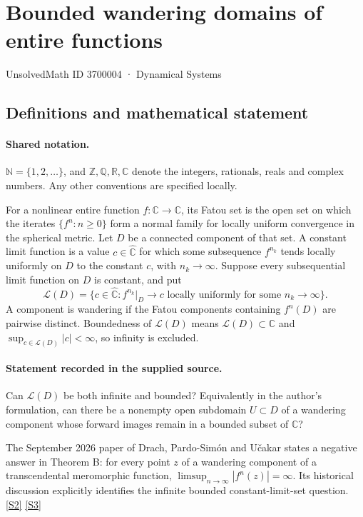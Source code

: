 \documentclass[11pt]{article}
\newcommand{\sref}[2]{\hyperlink{source:#1:#2}{[S#2]}}
\begin{document}
\setcounter{section}{3700003}
\section{Bounded wandering domains of entire functions}\label{3700004}
{\small\sffamily UnsolvedMath ID 3700004 · Dynamical Systems}
\subsection{Definitions and mathematical statement}

\paragraph{Shared notation.}$\mathbb N=\{1,2,\ldots\}$, and $\mathbb Z,\mathbb Q,\mathbb R,\mathbb C$ denote the integers, rationals, reals and complex numbers. Any other conventions are specified locally.


For a nonlinear entire function $f:\mathbb C\to\mathbb C$, its Fatou set is the open set on which the iterates $\{f^n:n\ge0\}$ form a normal family for locally uniform convergence in the spherical metric. Let $D$ be a connected component of that set. A constant limit function is a value $c\in\widehat{\mathbb C}$ for which some subsequence $f^{n_k}$ tends locally uniformly on $D$ to the constant $c$, with $n_k\to\infty$. Suppose every subsequential limit function on $D$ is constant, and put
\[
\mathcal L(D)=\{c\in\widehat{\mathbb C}: f^{n_k}|_D\longrightarrow c\text{ locally uniformly for some }n_k\to\infty\}.
\]
A component is wandering if the Fatou components containing $f^n(D)$ are pairwise distinct. Boundedness of $\mathcal L(D)$ means $\mathcal L(D)\subset\mathbb C$ and $\sup_{c\in\mathcal L(D)}|c|<\infty$, so infinity is excluded.
\paragraph{Statement recorded in the supplied source.}
Can $\mathcal L(D)$ be both infinite and bounded? Equivalently in the author's formulation, can there be a nonempty open subdomain $U\subset D$ of a wandering component whose forward images remain in a bounded subset of $\mathbb C$?

The September 2026 paper of Drach, Pardo-Simón and Učakar states a negative answer in Theorem B: for every point $z$ of a wandering component of a transcendental meromorphic function, $\limsup_{n\to\infty}|f^n(z)|=\infty$. Its historical discussion explicitly identifies the infinite bounded constant-limit-set question. \sref{3700004}{2} \sref{3700004}{3}
\end{document}
